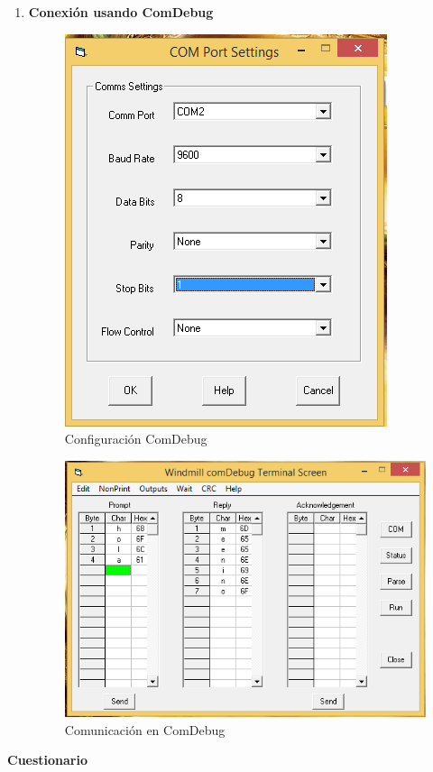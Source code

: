 \documentclass[a4paper,12pt]{article}
\begin{document}
\begin{enumerate}
 \item \textbf{Conexión usando ComDebug}
 \begin{figure}[H]
  \centering
  \includegraphics[scale = 0.5]{7.png}
  \caption{Configuración ComDebug}
 \end{figure}
 \begin{figure}[H]
  \centering
  \includegraphics[scale = 0.5]{8.png}
  \caption{Comunicación en ComDebug}
 \end{figure} 
\end{enumerate}

\begin{large}
 \textbf{Cuestionario}
\end{large}
\end{document}
